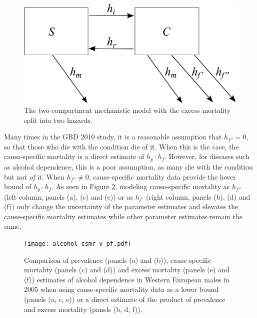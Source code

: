     \begin{figure}[h]
        \begin{center}
            \includegraphics[width=\textwidth]{SC2.pdf}
            \caption{The two-compartment mechanistic model with the
              excess mortality split into two hazards.}
            \label{fig:two_compartment_2f}
        \end{center}
    \end{figure}

Many times in the GBD 2010 study, it is a reasonable assumption that
$h_{f''} = 0$, so that those who die with the condition die of it.
When this is the case, the cause-specific mortality is a direct
estimate of $h_{p} \cdot h_{f}$.  However, for diseases such as alcohol
dependence, this is a poor assumption, as many die with the condition
but not \emph{of} it.  When $h_{f''} \neq 0$, cause-specific mortality
data provide the lower bound of $h_{p} \cdot h_{f}$.  As seen in Figure
\ref{fig:app-alcohol compare}, modeling cause-specific mortality as
$h_{f''}$ (left column, panels (a), (c) and (e)) or as $h_{f'}$ (right
column, panels (b), (d) and (f)) only change the uncertainty of the
parameter estimates and elevates the cause-specific mortality
estimates while other parameter estimates remain the same.

    \begin{figure}[h]
        \begin{center}
            \texttt{[image: alcohol-csmr\_v\_pf.pdf]}
            \caption{Comparison of prevalence (panels (a) and (b)),
              cause-specific mortality (panels (c) and (d)) and excess
              mortality (panels (e) and (f)) estimates of alcohol
              dependence in Western European males in 2005 when using
              cause-specific mortality data as a lower bound (panels
              (a, c, e)) or a direct estimate of the product of
              prevalence and excess mortality (panels (b, d, f)).}
            \label{fig:app-alcohol compare}
        \end{center}
    \end{figure}
